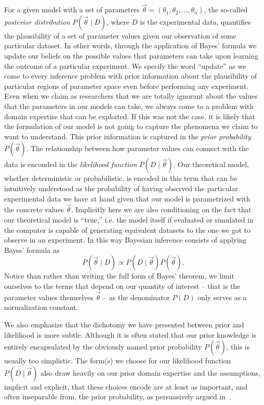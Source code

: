 For a given model with a set of parameters $\vec{\theta} = (\theta_1, \theta_2,
\ldots, \theta_n)$, the so-called \textit{posterior distribution} 
$P(\vec{\theta} \mid D)$, where $D$ is the experimental data, quantifies the
plausibility of a set of parameter values given our observation of some
particular dataset. In other words, through the application of Bayes' formula we
update our beliefs on the possible values that parameters can take upon learning
the outcome of a particular experiment. We specify the word ``update'' as we
come to every inference problem with prior information about the plausibility of
particular regions of parameter space even before performing any experiment.
Even when we claim as researchers that we are totally ignorant about the values
that the parameters in our models can take, we always come to a problem with
domain expertise that can be exploited. If this was not the case, it is likely
that the formulation of our model is not going to capture the phenomena we claim
to want to understand. This prior information is captured in the \textit{prior
probability} $P(\vec{\theta})$. The relationship between how parameter values
can connect with the data is enconded in the \textit{likelihood function} $P(D
\mid \vec{\theta})$. Our theoretical model, whether deterministic or
probabilistic, is encoded in this term that can be intuitively understood as the
probability of having observed the particular experimental data we have at hand
given that our model is parametrized with the concrete values $\vec{\theta}$. 
Implicitly here we are also conditioning on the fact that our theoretical model
is ``true,'' i.e. the model itself if evaluated or simulated in the computer is
capable of generating equivalent datasets to the one we got to observe in an 
experiment. In this way Bayesian inference consists of applying Bayes' formula 
as 
\begin{equation}
P(\vec{\theta} \mid D) \propto P(D \mid \vec{\theta}) P(\vec{\theta}).
\end{equation}
Notice than rather than writing the full form of Bayes' theorem, we limit 
ourselves to the terms that depend on our quantity of interest -- that is the 
parameter values themselves $\vec{\theta}$ -- as the denominator $P(D)$ only
serves as a normalization constant.

We also emphasize that the dichotomy we have presented between prior and
likelihood is more subtle. Although it is often stated that our prior
knowledge is entirely encapsulated by the obviously named prior
probability $P(\vec{\theta})$, this is usually too simplistic.
The form(s) we choose for our likelihood function
$P(D \mid \vec{\theta})$ also draw heavily on our prior domain expertise
and the assumptions, implicit and explicit, that these choices encode are
at least as important, and often inseparable from,
the prior probability, as persuasively argued in~\cite{Gelman2017}.

